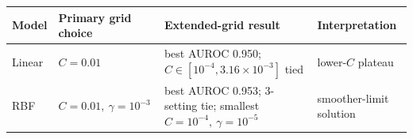 \begin{tabular}{llll}
\toprule
Model & Primary grid choice & Extended-grid result & Interpretation \\
\midrule
Linear & $C=0.01$ & best AUROC 0.950; $C\in[10^{-4},3.16\!\times\!10^{-3}]$ tied & lower-$C$ plateau \\
RBF & $C=0.01,\ \gamma=10^{-3}$ & best AUROC 0.953; 3-setting tie; smallest $C=10^{-4},\ \gamma=10^{-5}$ & smoother-limit solution \\
\bottomrule
\end{tabular}
